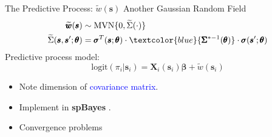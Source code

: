 \documentclass{beamer}
\begin{document}
% 

\begin{frame}[fragile]{The Predictive Process: $\widetilde{w}(\pmb{s})$}
Another Gaussian Random Field
\begin{align*}
\widetilde{\pmb{w}}(\pmb{s}) &\sim \text{MVN}\{0, \widetilde{\Sigma}(\cdot)\} \\
\widetilde{\Sigma}(\pmb{s}, \pmb{s}'; \pmb{\theta}) &= \pmb{\sigma}^{T}(\pmb{s};\pmb{\theta}) \cdot \textcolor{blue}{\pmb{\Sigma}^{*-1}(\pmb{\theta})} \cdot \pmb{\sigma}(\pmb{s}';\pmb{\theta})
\end{align*}
Predictive process model:
    \begin{equation}
    \text{logit}(\pi_{i}|\pmb{s}_{i}) = \pmb{X}_{i}(\pmb{s}_{i}) \pmb{\beta} + \widetilde{w}(\pmb{s}_{i}) \nonumber
    \end{equation}
    \begin{itemize}
    \item Note dimension of \textcolor{blue}{covariance matrix}.
    \item Implement in {\bf spBayes} \citep{Finley2013}.
    \item Convergence problems
    \end{itemize}
\end{frame}
\end{document}
